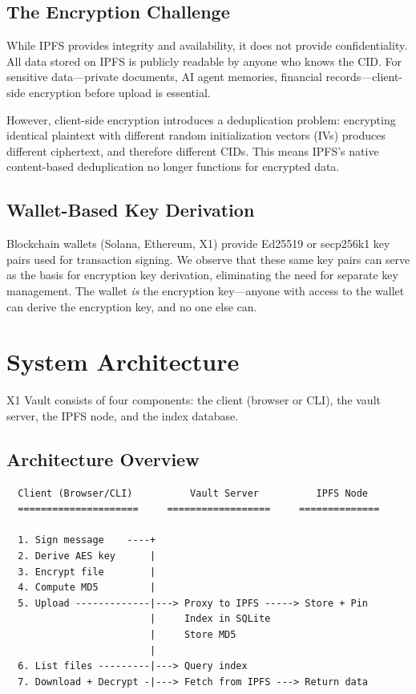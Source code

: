 \documentclass[11pt,a4paper]{article}
\begin{document}
\subsection{The Encryption Challenge}

While IPFS provides integrity and availability, it does not provide confidentiality. All data stored on IPFS is publicly readable by anyone who knows the CID. For sensitive data---private documents, AI agent memories, financial records---client-side encryption before upload is essential.

However, client-side encryption introduces a deduplication problem: encrypting identical plaintext with different random initialization vectors (IVs) produces different ciphertext, and therefore different CIDs. This means IPFS's native content-based deduplication no longer functions for encrypted data.

\subsection{Wallet-Based Key Derivation}

Blockchain wallets (Solana, Ethereum, X1) provide Ed25519 or secp256k1 key pairs used for transaction signing. We observe that these same key pairs can serve as the basis for encryption key derivation, eliminating the need for separate key management. The wallet \textit{is} the encryption key---anyone with access to the wallet can derive the encryption key, and no one else can.

\section{System Architecture}

X1 Vault consists of four components: the client (browser or CLI), the vault server, the IPFS node, and the index database.

\subsection{Architecture Overview}

\begin{verbatim}
  Client (Browser/CLI)          Vault Server          IPFS Node
  =====================     ==================     ==============

  1. Sign message    ----+
  2. Derive AES key      |
  3. Encrypt file        |
  4. Compute MD5         |
  5. Upload -------------|---> Proxy to IPFS -----> Store + Pin
                         |     Index in SQLite
                         |     Store MD5
                         |
  6. List files ---------|---> Query index
  7. Download + Decrypt -|---> Fetch from IPFS ---> Return data
\end{verbatim}
\end{document}
